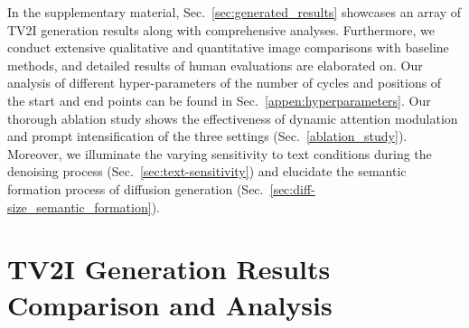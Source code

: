 

\appendix
\setcounter{table}{0}
% 
In the supplementary material, Sec.~\ref{sec:generated_results} showcases an array of TV2I generation results along with comprehensive analyses. 
Furthermore, we conduct extensive qualitative and quantitative image comparisons with baseline methods, and detailed results of human evaluations are elaborated on. 
Our analysis of different hyper-parameters of the number of cycles and positions of the start and end points can be found in Sec.~\ref{appen:hyperparameters}.
Our thorough ablation study shows the effectiveness of dynamic attention modulation and prompt intensification of the three settings (Sec.~\ref{ablation_study}).
Moreover, we illuminate the varying sensitivity to text conditions during the denoising process (Sec.~\ref{sec:text-sensitivity}) and elucidate the semantic formation process of diffusion generation (Sec.~\ref{sec:diff-size_semantic_formation}).

\section*{TV2I Generation Results Comparison and Analysis}\label{sec:generated_results}
